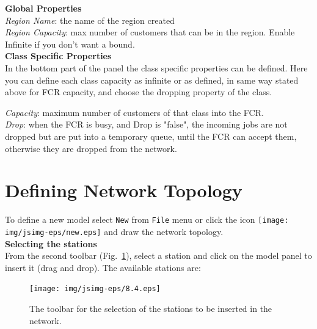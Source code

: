\textbf{Global Properties}\\
 \emph{Region Name}: the name of the region
created\\
\emph{Region Capacity}: max number of customers that can be in the
region. Enable Infinite if you don't want a bound.\\

\textbf{Class Specific Properties}\\
 In the bottom part of the
panel the class specific properties can be defined. Here you can
define each class capacity as infinite or as defined, in same way
stated above for FCR capacity, and choose the dropping property of
the class.

\emph{Capacity}: maximum number of customers of that class into
the FCR.\\
\emph{Drop}: when the FCR is busy, and Drop is "false", the
incoming jobs are not dropped but are put into a temporary queue,
until the FCR can accept them, otherwise they are dropped from the
network.

\section{Defining Network Topology}
\label{defnettop}
To define a new model select \texttt{New} from \texttt{File} menu or
click the icon
\texttt{[image: img/jsimg-eps/new.eps]} and draw the
network topology.\\

\noindent \textbf{Selecting the stations}\\ From the second
toolbar (Fig.~\ref{fig:statdraw}), select a station and click on
the model panel to insert it (drag and drop). The available
stations
are:\\
\begin{figure}[h!]
    \begin{center}
        \texttt{[image: img/jsimg-eps/8.4.eps]}
    \end{center}
    \caption{The toolbar for the selection of the stations to be
    inserted in the network.}
    \label{fig:statdraw}
\end{figure}\\

